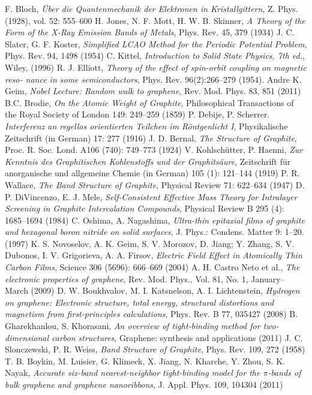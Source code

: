 \begin{thebibliography}{99}

 F. Bloch, \textit{Über die Quantenmechanik der Elektronen in Kristallgittern}, Z. Phys. (1928), vol. 52: 555–600
 H. Jones, N. F. Mott,  H. W. B. Skinner, \textit{A Theory of the Form of the X-Ray Emission Bands of Metals}, Phys. Rev. 45, 379 (1934)
 J. C. Slater, G. F. Koster, \textit{Simplified LCAO Method for the Periodic Potential Problem}, Phys. Rev. 94, 1498 (1954)
 C. Kittel, \textit{Introduction to Solid State Physics, 7th ed.}, Wiley, (1996) 
 R. J. Elliott, \textit{Theory of the effect of spin-orbit coupling on magnetic reso-
nance in some semiconductors}, Phys. Rev. 96(2):266–279 (1954).
 Andre K. Geim, \textit{Nobel Lecture: Random walk to graphene}, Rev. Mod. Phys. 83, 851 (2011)
 B.C. Brodie, \textit{On the Atomic Weight of Graphite},  Philosophical Transactions of the Royal Society of London 149: 249–259 (1859)
 P. Debije, P. Scherrer. \textit{Interferenz an regellos orientierten Teilchen im Röntgenlicht I}, Physikalische Zeitschrift (in German) 17: 277 (1916)
 J. D. Bernal, \textit{The Structure of Graphite}, Proc. R. Soc. Lond. A106 (740): 749–773 (1924)
 V. Kohlschütter, P. Haenni, \textit{Zur Kenntnis des Graphitischen Kohlenstoffs und der Graphitsäure}, Zeitschrift für anorganische und allgemeine Chemie (in German) 105 (1): 121–144  (1919)
 P. R. Wallace, \textit{The Band Structure of Graphite}, Physical Review 71: 622–634 (1947)
 D. P. DiVincenzo, E. J. Mele, \textit{Self-Consistent Effective Mass Theory for Intralayer Screening in Graphite Intercalation Compounds}, Physical Review B 295 (4): 1685–1694 (1984)
 C. Oshima, A. Nagashima, \textit{Ultra-thin epitaxial films of graphite and hexagonal boron nitride on solid surfaces}, J. Phys.: Condens. Matter 9: 1–20. (1997)
 K. S. Novoselov, A. K. Geim, S. V. Morozov, D. Jiang; Y. Zhang, S. V. Dubonos, I. V. Grigorieva, A. A. Firsov, \textit{Electric Field Effect in Atomically Thin Carbon Films}, Science 306 (5696): 666–669 (2004)
 A. H. Castro Neto et al., \textit{The electronic properties of graphene}, Rev. Mod. Phys., Vol. 81, No. 1, January–March (2009)
 D. W. Boukhvalov, M. I. Katsnelson, A. I. Lichtenstein, \textit{Hydrogen on graphene: Electronic structure, total energy, structural distortions and magnetism
from first-principles calculations}, Phys. Rev. B 77, 035427 (2008)
 B. Gharekhanlou, S. Khorasani, \textit{An overview of tight-binding method for two-dimensional carbon structures}, Graphene: synthesis and applications (2011)
 J. C. Slonczewski, P. R. Weiss, \textit{Band Structure of Graphite}, Phys. Rev. 109, 272 (1958)
 T. B. Boykin, M. Luisier, G. Klimeck, X. Jiang, N. Kharche, Y. Zhou, S. K. Nayak, \textit{Accurate six-band nearest-neighbor tight-binding model for the $\pi$-bands of bulk graphene and graphene nanoribbons}, J. Appl. Phys. 109, 104304 (2011)
\end{thebibliography}
